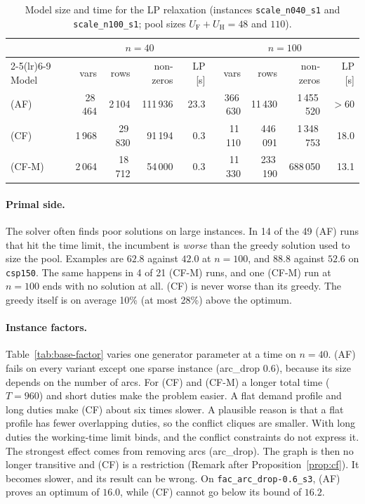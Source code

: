 \begin{table}[ht]
\centering
\small
\caption{Model size and time for the LP relaxation (instances
\texttt{scale\_n040\_s1} and \texttt{scale\_n100\_s1}; pool sizes
$U_{\mathrm F}+U_{\mathrm H}=48$ and $110$).}
\label{tab:base-size}
\begin{tabular}{@{}lrrrrrrrr@{}}
\toprule
& \multicolumn{4}{c}{$n=40$} & \multicolumn{4}{c}{$n=100$} \\
\cmidrule(lr){2-5}\cmidrule(lr){6-9}
Model & vars & rows & non-zeros & LP [s] & vars & rows & non-zeros & LP [s] \\
\midrule
(AF)   & 28\,464 & 2\,104  & 111\,936 & 23.3 & 366\,630 & 11\,430  & 1\,455\,520 & $>60$ \\
(CF)   & 1\,968  & 29\,830 & 91\,194  & 0.3  & 11\,110  & 446\,091 & 1\,348\,753 & 18.0 \\
(CF-M) & 2\,064  & 18\,712 & 54\,000  & 0.3  & 11\,330  & 233\,190 & 688\,050    & 13.1 \\
\bottomrule
\end{tabular}
\end{table}

\paragraph{Primal side.} The solver often finds poor solutions on large
instances. In 14 of the 49 (AF) runs that hit the time limit, the incumbent
is \emph{worse} than the greedy solution used to size the pool. Examples are
$62.8$ against $42.0$ at $n=100$, and $88.8$ against $52.6$ on
\texttt{csp150}. The same happens in 4 of 21 (CF-M) runs, and one (CF-M) run at
$n=100$ ends with no solution at all. (CF) is never worse than its greedy.
The greedy itself is on average 10\% (at most 28\%) above the optimum.

\paragraph{Instance factors.} Table~\ref{tab:base-factor} varies one generator
parameter at a time on $n=40$. (AF) fails on every variant except one sparse
instance (arc\_drop $0.6$), because its size depends on the number of arcs.
For (CF) and (CF-M) a longer total time ($T=960$) and short duties make the
problem easier. A flat demand profile and long duties make (CF) about six
times slower. A plausible reason is that a flat profile has fewer overlapping
duties, so the conflict cliques are smaller. With long duties the working-time
limit binds, and the conflict constraints do not express it. The
strongest effect comes from removing arcs (arc\_drop). The graph is then no
longer transitive and (CF) is a restriction (Remark after
Proposition~\ref{prop:cf}). It becomes slower, and its result can be wrong. On
\texttt{fac\_arc\_drop-0.6\_s3}, (AF) proves an optimum of $16.0$, while (CF)
cannot go below its bound of $16.2$.

